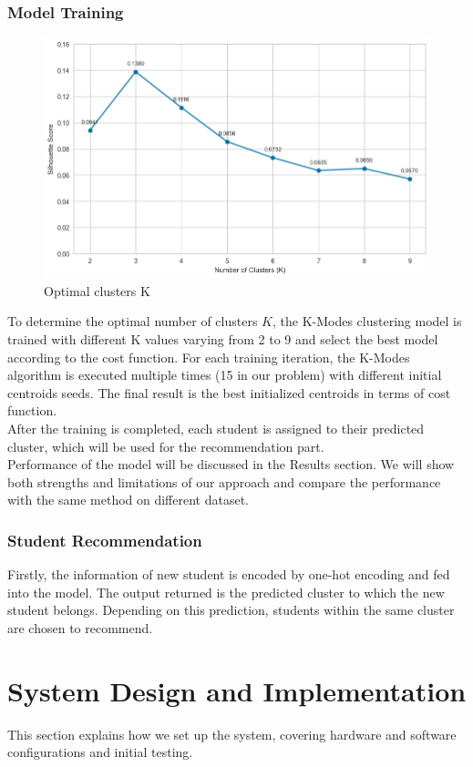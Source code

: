 \documentclass[12pt]{article}
\begin{document}
\subsubsection{Model Training}
\begin{figure}[H]
    \centering
    \includegraphics[width=0.7\linewidth]{image/choosing_K.png}
    \caption{Optimal clusters K}
    \label{fig:choosing_K}
\end{figure}

To determine the optimal number of clusters $K$, the K-Modes clustering model is trained with different K values varying from 2 to 9 and select the best model according to the cost function. For each training iteration, the K-Modes algorithm is executed multiple times (15 in our problem) with different initial centroids seeds. The final result is the best initialized centroids in terms of cost function.\citep{devos2015}\\

After the training is completed, each student is assigned to their predicted cluster, which will be used for the recommendation part.\\

Performance of the model will be discussed in the Results section. We will show both strengths and limitations of our approach and compare the performance with the same method on different dataset.

\subsubsection{Student Recommendation}
Firstly, the information of new student is encoded by one-hot encoding and fed into the model. The output returned is the predicted cluster to which the new student belongs. Depending on this prediction, students within the same cluster are chosen to recommend.

\pagebreak

\section{System Design and Implementation}  
This section explains how we set up the system, covering hardware and software configurations and initial testing.
\end{document}
